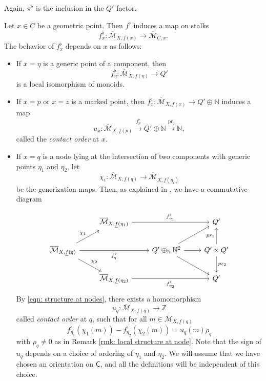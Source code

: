 \documentclass{article}
\def\N{{\mathbb{N}}}
\def\oM{\overline{\mathcal{M}}}
\def\Z{\mathbb{Z}}
\begin{document}
Again, $\pi^\flat$ is the inclusion in the $Q'$ factor.

Let $x \in \underline{C}$ be a geometric point. Then $f^\flat$ induces a map on stalks
\[
f^\flat_x: \oM_{X,\underline{f}(x)} \to \oM_{\underline{C},x}.
\]
The behavior of $f_x^\flat$ depends on \(x\) as follows: 

\begin{itemize}
    \item If $x = \eta$ is a generic point of a component, then
    \[
    f^\flat_\eta : \oM_{X,\underline{f}(\eta)} \to Q'
    \]
    is a local isomorphism of monoids. 

    \item If $x = p$ or $x=z$ is a marked point, then
    $
    f^\flat_x: \oM_{X,\underline{f}(x)} \to Q' \oplus \mathbb{N}
    $
    induces a map
    \begin{equation}\label{eqn:contact_order}
        u_x: \oM_{X,\underline{f}(p)} \xrightarrow{f^\flat_p} Q' \oplus \mathbb{N} \xrightarrow{\mathrm{pr}_2} \mathbb{N},
    \end{equation}
    called the \emph{contact order} at $x$.

    \item If $x = q$ is a node lying at the intersection of two components with generic points $\eta_1$ and $\eta_2$, let
    \[
    \chi_i: \oM_{X,\underline{f}(q)} \to \oM_{X,\underline{f}(\eta_i)}
    \]
    be the generization maps. Then, as explained in \cite{GS2013}, we have a commutative diagram

    \[
    \begin{tikzcd}
    & \oM_{X,\underline{f}(\eta_1)} \ar[rr, "f^\flat_{\eta_1}"]  & & Q'  \\
    \oM_{X,\underline{f}(q)} \ar[ur, "\chi_1"] \ar[dr, "\chi_2"] \ar[rr, "f^\flat_q"'] & & Q' \oplus_{\mathbb{N}} \N^2 \ar[ur] \ar[dr] \ar[r] & Q' \times Q' \ar[d, "pr_2"] \ar[u, "pr_1"] \\
    & \oM_{X,\underline{f}(\eta_2)} \ar[rr, "f^\flat_{\eta_2}"']  & & Q'
    \end{tikzcd}
    \]
    By \eqref{eqn: structure at nodes}, there exists a homomorphism
    \begin{equation}
        u_q: \oM_{X,\underline{f}(q)} \to \Z
    \end{equation}
    called \emph{contact order} at $q$, such that for all $m \in \oM_{X,\underline{f}(q)}$
    \begin{equation}\label{eqn: relations}
    f^\flat_{\eta_1}(\chi_1(m))-f^\flat_{\eta_2}(\chi_2(m))= u_q(m) \rho_q
    \end{equation}
    with $\rho_q \neq 0$ as in Remark \ref{rmk: local structure at node}. Note that the sign of $u_q$ depends on a choice of ordering of $\eta_1$ and $\eta_2$. We will assume that we have chosen an orientation on $\mathsf{C}$, and all the definitions will be independent of this choice.
\end{itemize}
\end{document}
